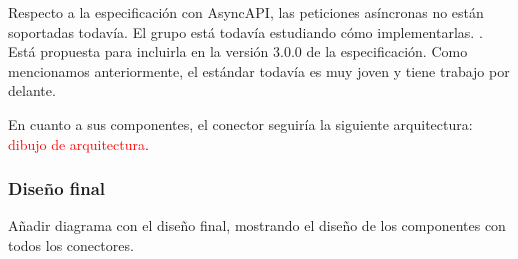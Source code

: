 Respecto a la especificación con AsyncAPI, las peticiones asíncronas no están soportadas todavía. El grupo está todavía estudiando cómo implementarlas. . Está propuesta para incluirla en la versión 3.0.0 de la especificación. Como mencionamos anteriormente, el estándar todavía es muy joven y tiene trabajo por delante.

En cuanto a sus componentes, el conector seguiría la siguiente arquitectura: \textcolor{red}{dibujo de arquitectura}.

\subsubsection{Diseño final}

Añadir diagrama con el diseño final, mostrando el diseño de los componentes con todos los conectores.
